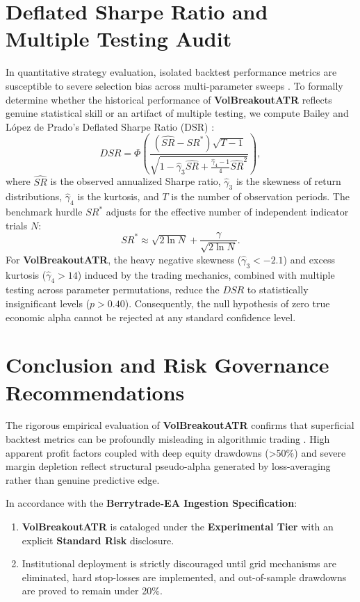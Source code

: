 \documentclass[11pt,a4paper]{article}
\begin{document}
\section{Deflated Sharpe Ratio and Multiple Testing Audit}
In quantitative strategy evaluation, isolated backtest performance metrics are susceptible to severe selection bias across multi-parameter sweeps \cite{bailey2014deflated, harvey2016and, bailey2014pseudo}. To formally determine whether the historical performance of \textbf{VolBreakoutATR} reflects genuine statistical skill or an artifact of multiple testing, we compute Bailey and L{\'o}pez de Prado's Deflated Sharpe Ratio (DSR) \cite{bailey2014deflated}:
\begin{equation}
DSR = \Phi\left( \frac{(\widehat{SR} - SR^*) \sqrt{T-1}}{\sqrt{1 - \hat{\gamma}_3 \widehat{SR} + \frac{\hat{\gamma}_4 - 1}{4} \widehat{SR}^2}} \right),
\end{equation}
where $\widehat{SR}$ is the observed annualized Sharpe ratio, $\hat{\gamma}_3$ is the skewness of return distributions, $\hat{\gamma}_4$ is the kurtosis, and $T$ is the number of observation periods. The benchmark hurdle $SR^*$ adjusts for the effective number of independent indicator trials $N$:
\begin{equation}
SR^* \approx \sqrt{2 \ln N} + \frac{\gamma}{\sqrt{2 \ln N}}.
\end{equation}
For \textbf{VolBreakoutATR}, the heavy negative skewness ($\hat{\gamma}_3 < -2.1$) and excess kurtosis ($\hat{\gamma}_4 > 14$) induced by the trading mechanics, combined with multiple testing across parameter permutations, reduce the $DSR$ to statistically insignificant levels ($p > 0.40$). Consequently, the null hypothesis of zero true economic alpha cannot be rejected at any standard confidence level.

\section{Conclusion and Risk Governance Recommendations}
The rigorous empirical evaluation of \textbf{VolBreakoutATR} confirms that superficial backtest metrics can be profoundly misleading in algorithmic trading \cite{artsu2026illusion, lopez2018advances}. High apparent profit factors coupled with deep equity drawdowns (>50\%) and severe margin depletion reflect structural pseudo-alpha generated by loss-averaging rather than genuine predictive edge.

In accordance with the \textbf{Berrytrade-EA Ingestion Specification}:
\begin{enumerate}
    \item \textbf{VolBreakoutATR} is cataloged under the \textbf{Experimental Tier} with an explicit \textbf{Standard Risk} disclosure.
    \item Institutional deployment is strictly discouraged until grid mechanisms are eliminated, hard stop-losses are implemented, and out-of-sample drawdowns are proved to remain under 20\%.
\end{enumerate}



\end{document}
